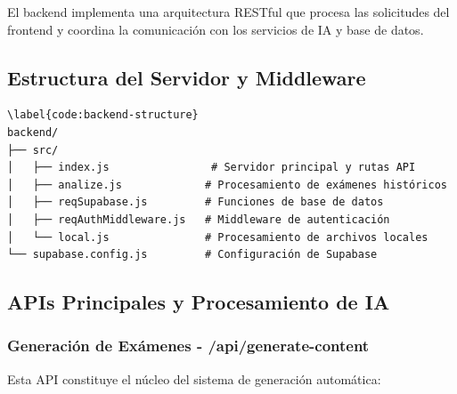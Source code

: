 \documentclass[12pt,a4paper]{report}
\begin{document}
El backend implementa una arquitectura RESTful que procesa las solicitudes del frontend y coordina la comunicación con los servicios de IA y base de datos.

\subsection{Estructura del Servidor y Middleware}

\begin{lstlisting}[language=text, caption={Código \ref{code:backend-structure}: Organización del servidor backend}]
\label{code:backend-structure}
backend/
├── src/
│   ├── index.js                # Servidor principal y rutas API
│   ├── analize.js             # Procesamiento de exámenes históricos
│   ├── reqSupabase.js         # Funciones de base de datos
│   ├── reqAuthMiddleware.js   # Middleware de autenticación
│   └── local.js               # Procesamiento de archivos locales
└── supabase.config.js         # Configuración de Supabase
\end{lstlisting}

\subsection{APIs Principales y Procesamiento de IA}

\subsubsection{Generación de Exámenes - /api/generate-content}

Esta API constituye el núcleo del sistema de generación automática:
\end{document}
